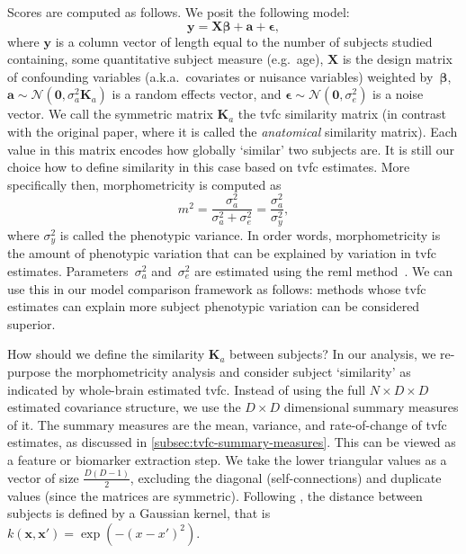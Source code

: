Scores are computed as follows.
We posit the following model:
\begin{equation}
  \mathbf{y} = \mathbf{X} \mathbf{\beta} + \mathbf{a} + \mathbf{\epsilon},
  \label{eq:lme}
\end{equation}
where $\mathbf{y}$ is a column vector of length equal to the number of subjects studied containing, some quantitative subject measure (e.g.~age), $\mathbf{X}$ is the design matrix of confounding variables (a.k.a.~covariates or nuisance variables) weighted by~$\mathbf{\beta}$, $\mathbf{a}\sim \mathcal{N}(\mathbf{0}, \sigma_a^2 \mathbf{K}_a)$ is a random effects vector, and $\mathbf{\epsilon} \sim \mathcal{N}(\mathbf{0}, \sigma_e^2)$ is a noise vector.
We call the symmetric matrix $\mathbf{K}_a$ the \gls{tvfc} similarity matrix (in contrast with the original paper, where it is called the \emph{anatomical} similarity matrix).
Each value in this matrix encodes how globally `similar' two subjects are.
It is still our choice how to define similarity in this case based on \gls{tvfc} estimates.
More specifically then, morphometricity is computed as
\begin{equation}
  m^2 = \frac{\sigma_a^2}{\sigma_a^2 + \sigma_e^2} = \frac{\sigma_a^2}{\sigma_y^2},
\end{equation}
where $\sigma_y^2$ is called the phenotypic variance.
In order words, morphometricity is the amount of phenotypic variation that can be explained by variation in \gls{tvfc} estimates.
Parameters~$\sigma_a^2$ and~$\sigma_e^2$ are estimated using the \gls{reml} method~\parencite{Patterson1971, Harville1977}.
We can use this in our model comparison framework as follows: methods whose \gls{tvfc} estimates can explain more subject phenotypic variation can be considered superior.

How should we define the similarity $\mathbf{K}_a$ between subjects?
In our analysis, we re-purpose the morphometricity analysis and consider subject `similarity' as indicated by whole-brain estimated \gls{tvfc}.
Instead of using the full $N \times D \times D$ estimated covariance structure, we use the $D \times D$ dimensional summary measures of it.
The summary measures are the mean, variance, and rate-of-change of \gls{tvfc} estimates, as discussed in \cref{subsec:tvfc-summary-measures}.
This can be viewed as a feature or biomarker extraction step.
We take the lower triangular values as a vector of size $\frac{D(D-1)}{2}$, excluding the diagonal (self-connections) and duplicate values (since the matrices are symmetric).
Following \textcite{Sabuncu2016}, the distance between subjects is defined by a Gaussian kernel, that is $k(\textbf{x}, \textbf{x}') = \exp(-(x-x')^2)$.

